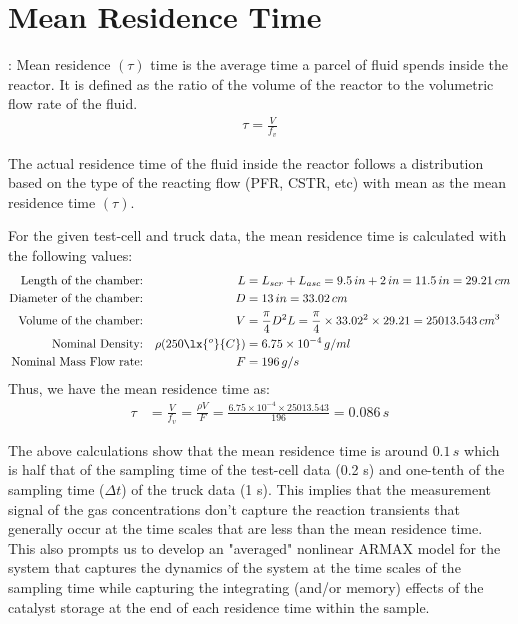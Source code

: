 \newpage
\section{Mean Residence Time}

: Mean residence $(\tau)$ time is the average time a parcel of fluid spends inside the reactor. It is
defined as the ratio of the volume of the reactor to the volumetric flow rate of the fluid.
\begin{align}
    \tau = \frac{V}{f_v}
\end{align}

The actual residence time of the fluid inside the reactor follows a distribution based on the type of the reacting flow
(PFR, CSTR, etc) with mean as the mean residence time $(\tau)$.

For the given test-cell and truck data, the mean residence time is calculated with the following values:
\begin{align*}
    \text{Length of the chamber:}&&
    L &= L_{scr} + L_{asc} = 9.5 \, in  + 2 \, in = 11.5 \, in = 29.21 \, cm\\
    \text{Diameter of the chamber:} &&
    D &= 13 \, in = 33.02 \, cm\\
    \text{Volume of the chamber:} &&
    V &= \frac{\pi}{4} D^2 L = \frac{\pi}{4} \times 33.02^2 \times 29.21 = 25013.543 \, cm^3\\
    \text{Nominal Density:} &&
    \rho(250 \lx{^o}{C}) &= 6.75 \times 10^{-4} \, g/ml\\
    \text{Nominal Mass Flow rate:} &&
    F &= 196 \, g/s
\end{align*}
Thus, we have the mean residence time as:
\begin{align}
    \tau &= \frac{V}{f_v} = \frac{\rho V}{F} = \frac{6.75 \times 10^{-4} \times 25013.543}{196} = 0.086 \, s
\end{align}


The above calculations show that the mean residence time is around $0.1 \, s$ which is half that of the sampling time of
the test-cell data (0.2 s) and one-tenth of the sampling time ($\Delta t$) of the truck data (1 s). This implies that
the measurement signal of the gas concentrations don't capture the reaction transients that generally occur at the time
scales  that are less than the mean residence time. This also prompts us to develop an "averaged" nonlinear ARMAX model
for the system that captures the dynamics of the system at the time scales of the sampling time while capturing the
integrating (and/or memory) effects of the catalyst storage at the end of each residence time within the sample.

